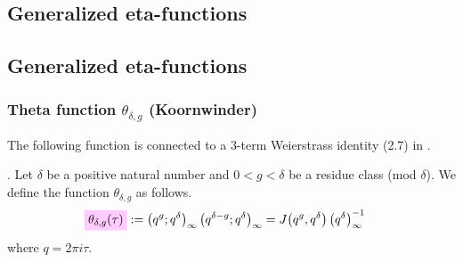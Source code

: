 \documentclass{article}
\begin{document}
\subsection{Generalized eta-functions}





\begin{Hemmecke}

\subsection{Generalized eta-functions}

\subsubsection{Theta function $\theta_{\delta,g}$ (Koornwinder)}

The following function is connected to a 3-term Weierstrass identity
(2.7) in \cite{Koornwinder_ThetaIdentities_2014}.

\begin{Definition}
  \cite[special case of equation (2.1)]{Koornwinder_ThetaIdentities_2014}.
  Let $\delta$ be a positive natural number and $0 < g < \delta$ be a
  residue class (mod $\delta$).
  We define the function $\theta_{\delta,g}$ as follows.
  \begin{align}
    \defineNotation[theta-delta-g-tau]{\theta_{\delta,g}(\tau)}
    &:=
      \qPochhammer{q^g}{q^\delta} \qPochhammer{q^{\delta-g}}{q^\delta}
      =
      \jacobiFunction{q^g}{q^\delta} \eulerFunction{\delta}^{-1}
      \label{eq:theta_delta-g(tau)}
  \end{align}
  where $q=2 \pi i \tau$.
\end{Definition}


\end{Hemmecke}
\end{document}

